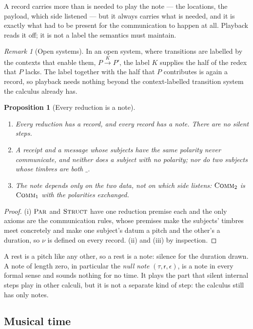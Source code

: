 \documentclass[11pt,a4paper]{article}
\theoremstyle{plain}
\newtheorem{proposition}[theorem]{Proposition}
\theoremstyle{definition}
\theoremstyle{remark}
\newtheorem{remark}[theorem]{Remark}
\let\oldsc\textsc
\renewcommand{\textsc}[1]{\textup{\oldsc{#1}}}
\newcommand{\nulld}{\epsilon}
\newcommand{\rest}{\mathsf{r}}
\newcommand{\wild}{\_}
\begin{document}
A record carries more than is needed to play the note --- the locations, the
payload, which side listened --- but it always carries what is needed, and it
is exactly what had to be present for the communication to happen at all.
Playback reads it off; it is not a label the semantics must maintain.

\begin{remark}[Open systems]\label{rem:open}
In an open system, where transitions are labelled by the contexts that enable
them, $P \xrightarrow{K} P'$, the label $K$ supplies the half of the redex that
$P$ lacks. The label together with the half that $P$ contributes is again a
record, so playback needs nothing beyond the context-labelled transition system
the calculus already has.
\end{remark}

\begin{proposition}[Every reduction is a note]\label{prop:note}
\begin{enumerate}[label=(\roman*),itemsep=1pt]
\item Every reduction has a record, and every record has a note. There are no
  silent steps.
\item A receipt and a message whose subjects have the same polarity never
  communicate, and neither does a subject with no polarity; nor do two subjects
  whose timbres are both $\wild$.
\item The note depends only on the two data, not on which side listens:
  $\textsc{Comm}_2$ is $\textsc{Comm}_1$ with the polarities exchanged.
\end{enumerate}
\end{proposition}
\begin{proof}
(i) $\textsc{Par}$ and $\textsc{Struct}$ have one reduction premise each and the
only axioms are the communication rules, whose premises make the subjects'
timbres meet concretely and make one subject's datum a pitch and the other's a
duration, so $\nu$ is defined on every record. (ii) and (iii) by inspection.
\end{proof}

A rest is a pitch like any other, so a rest is a note: silence for the duration
drawn. A note of length zero, in particular the \emph{null note}
$(\tau,\rest,\nulld)$, is a note in every formal sense and sounds nothing for no
time. It plays the part that silent internal steps play in other calculi, but it
is not a separate kind of step: the calculus still has only notes.

\subsection{Musical time}\label{ssec:time}
\end{document}
